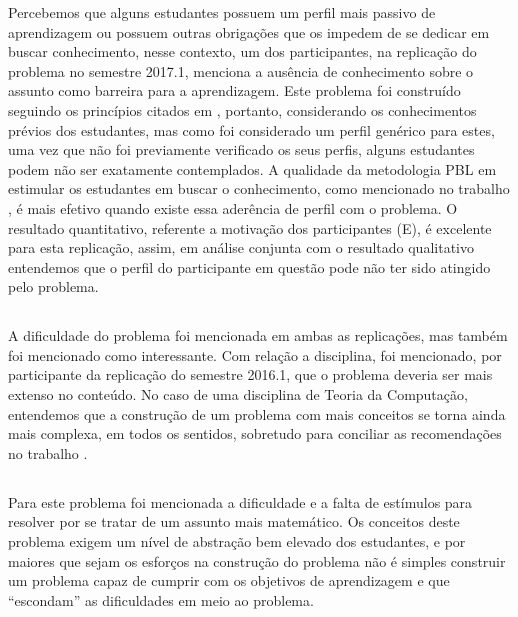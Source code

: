 Percebemos que alguns estudantes possuem um perfil mais passivo
de aprendizagem ou possuem outras obrigações que os impedem
de se dedicar em buscar conhecimento, nesse contexto,
um dos participantes, na replicação do problema no
semestre 2017.1, menciona a ausência de conhecimento
sobre o assunto como barreira para a aprendizagem.
Este problema foi construído seguindo
os princípios citados em ,
portanto, considerando os conhecimentos prévios
dos estudantes, mas como foi considerado um perfil
genérico para estes, uma vez que não foi
previamente verificado os seus perfis, alguns estudantes
podem não ser exatamente contemplados.
A qualidade da metodologia \ac{PBL} em estimular os estudantes
em buscar o conhecimento, como mencionado no trabalho
, é mais efetivo quando
existe essa aderência de perfil com o problema.
O resultado quantitativo, referente a motivação dos
participantes (E), é excelente para esta
replicação, assim, em análise conjunta com o
resultado qualitativo entendemos que o perfil
do participante em questão pode não ter sido
atingido pelo problema.

\subsection{\ProblemaE}

A dificuldade do problema foi mencionada em ambas as replicações, mas
também foi mencionado como interessante.
Com relação a disciplina, foi mencionado, por participante da
replicação do semestre 2016.1, que o problema deveria ser
mais extenso no conteúdo.
No caso de uma disciplina de Teoria da Computação, entendemos
que a construção de um problema com mais conceitos se
torna ainda mais complexa, em todos os sentidos, sobretudo
para conciliar as recomendações
no trabalho .

\subsection{\ProblemaF}

Para este problema foi mencionada a dificuldade e a falta de estímulos
para resolver por se tratar de um assunto mais matemático.
Os conceitos deste problema exigem um nível de abstração bem elevado
dos estudantes, e por maiores que sejam os esforços na construção
do problema não é simples construir um problema capaz de cumprir com
os objetivos de aprendizagem e que ``escondam'' as dificuldades
em meio ao problema.

